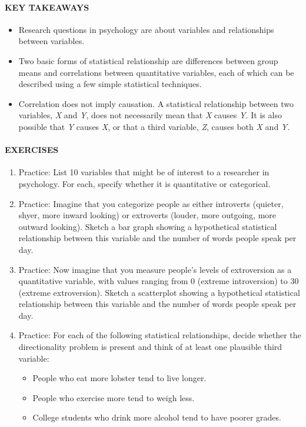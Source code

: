 \documentclass[
]{krantz}
\providecommand{\tightlist}{%
  \setlength{\itemsep}{0pt}\setlength{\parskip}{0pt}}
\begin{document}
\hypertarget{key-takeaways-4}{%
\paragraph*{KEY TAKEAWAYS}\label{key-takeaways-4}}

\begin{itemize}
\tightlist
\item
  Research questions in psychology are about variables and relationships between variables.
\item
  Two basic forms of statistical relationship are differences between group means and correlations between quantitative variables, each of which can be described using a few simple statistical techniques.
\item
  Correlation does not imply causation. A statistical relationship between two variables, \emph{X} and \emph{Y}, does not necessarily mean that \emph{X} causes \emph{Y.} It is also possible that \emph{Y} causes \emph{X}, or that a third variable, \emph{Z}, causes both \emph{X} and \emph{Y.}
\end{itemize}

\hypertarget{exercises-4}{%
\paragraph*{EXERCISES}\label{exercises-4}}

\begin{enumerate}
\def\labelenumi{\arabic{enumi}.}
\tightlist
\item
  Practice: List 10 variables that might be of interest to a researcher in psychology. For each, specify whether it is quantitative or categorical.
\item
  Practice: Imagine that you categorize people as either introverts (quieter, shyer, more inward looking) or extroverts (louder, more outgoing, more outward looking). Sketch a bar graph showing a hypothetical statistical relationship between this variable and the number of words people speak per day.
\item
  Practice: Now imagine that you measure people's levels of extroversion as a quantitative variable, with values ranging from 0 (extreme introversion) to 30 (extreme extroversion). Sketch a scatterplot showing a hypothetical statistical relationship between this variable and the number of words people speak per day.
\item
  Practice: For each of the following statistical relationships, decide whether the directionality problem is present and think of at least one plausible third variable:

  \begin{itemize}
  \tightlist
  \item
    People who eat more lobster tend to live longer.
  \item
    People who exercise more tend to weigh less.
  \item
    College students who drink more alcohol tend to have poorer grades.
  \end{itemize}
\end{enumerate}
\end{document}
